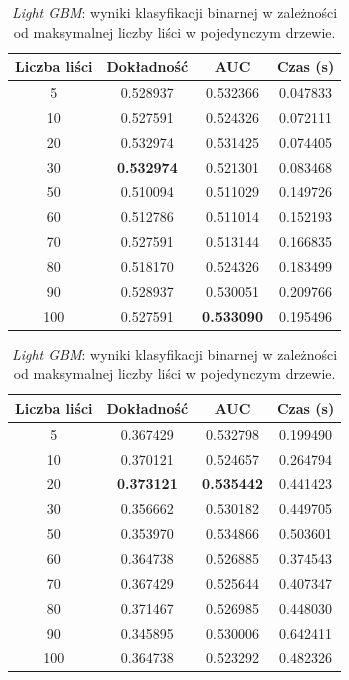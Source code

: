 \documentclass[a4paper, twoside, 11pt, openright]{article}
\begin{document}
\begin{table}[H]
    \centering
    \begin{tabular}{|c|c|c|c|}
    \hline
        \textbf{Liczba liści} & \textbf{Dokładność} & \textbf{AUC} & \textbf{Czas (s)} \\ \hline
5        &  0.528937 &  0.532366 &    0.047833 \\ \hline
10       &  0.527591 &  0.524326 &    0.072111 \\ \hline
20       &  0.532974 &  0.531425 &    0.074405 \\ \hline
30       &  \textbf{0.532974} &  0.521301 &    0.083468 \\ \hline
50       &  0.510094 &  0.511029 &    0.149726 \\ \hline
60       &  0.512786 &  0.511014 &    0.152193 \\ \hline
70       &  0.527591 &  0.513144 &    0.166835 \\ \hline
80       &  0.518170 &  0.524326 &    0.183499 \\ \hline
90       &  0.528937 &  0.530051 &    0.209766 \\ \hline
100      &  0.527591 &  \textbf{0.533090} &    0.195496 \\ \hline
    \end{tabular}
    \caption{\textit{Light GBM}: wyniki klasyfikacji binarnej w zależności od maksymalnej liczby liści w pojedynczym drzewie.}
    \label{tab:lgbm_num_leaves_binary}
\end{table}

\begin{table}[H]
    \centering
    \begin{tabular}{|c|c|c|c|}
    \hline
        \textbf{Liczba liści} & \textbf{Dokładność} & \textbf{AUC} & \textbf{Czas (s)} \\ \hline
5        &  0.367429 &  0.532798 &    0.199490 \\ \hline
10       &  0.370121 &  0.524657 &    0.264794 \\ \hline
20       &  \textbf{0.373121} &  \textbf{0.535442} &    0.441423 \\ \hline
30       &  0.356662 &  0.530182 &    0.449705 \\ \hline
50       &  0.353970 &  0.534866 &    0.503601 \\ \hline
60       &  0.364738 &  0.526885 &    0.374543 \\ \hline
70       &  0.367429 &  0.525644 &    0.407347 \\ \hline
80       &  0.371467 &  0.526985 &    0.448030 \\ \hline
90       &  0.345895 &  0.530006 &    0.642411 \\ \hline
100      &  0.364738 &  0.523292 &    0.482326 \\ \hline

    \end{tabular}
    \caption{\textit{Light GBM}: wyniki klasyfikacji binarnej w zależności od maksymalnej liczby liści w pojedynczym drzewie.}
    \label{tab:lgbm_num_leaves_discrete}
\end{table}
\end{document}
